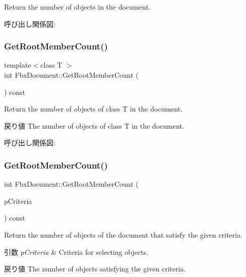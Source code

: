 Return the number of objects in the document. 

呼び出し関係図\+:
\mbox{\label{class_fbx_document_a947d3939526793022b921298efae1660}} 
\subsubsection{\texorpdfstring{Get\+Root\+Member\+Count()}{GetRootMemberCount()}\hspace{0.1cm}{\footnotesize\ttfamily [2/3]}}
{\footnotesize\ttfamily template$<$class T $>$ \\
int Fbx\+Document\+::\+Get\+Root\+Member\+Count (\begin{DoxyParamCaption}{ }\end{DoxyParamCaption}) const}

Return the number of objects of class T in the document. \begin{DoxyReturn}{戻り値}
The number of objects of class T in the document. 
\end{DoxyReturn}
呼び出し関係図\+:
\mbox{\label{class_fbx_document_a9befeca0b093870eb1df0b5dbe23fc0a}} 
\subsubsection{\texorpdfstring{Get\+Root\+Member\+Count()}{GetRootMemberCount()}\hspace{0.1cm}{\footnotesize\ttfamily [3/3]}}
{\footnotesize\ttfamily int Fbx\+Document\+::\+Get\+Root\+Member\+Count (\begin{DoxyParamCaption}\item[{\hyperlink{class_fbx_criteria}{Fbx\+Criteria}}]{p\+Criteria }\end{DoxyParamCaption}) const}

Return the number of objects of the document that satisfy the given criteria. 
\begin{DoxyParams}{引数}
{\em p\+Criteria} & Criteria for selecting objects. \\
\hline
\end{DoxyParams}
\begin{DoxyReturn}{戻り値}
The number of objects satisfying the given criteria. 
\end{DoxyReturn}
\mbox{\label{class_fbx_document_aa524095dfb1dcac18f7b359070841068}} 
